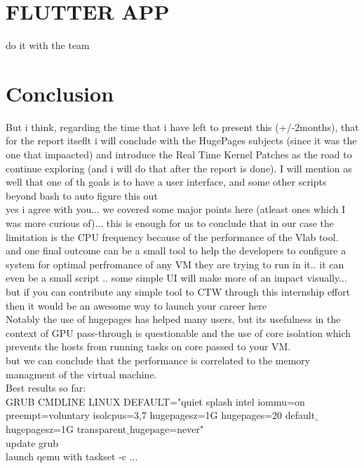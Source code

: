 \documentclass[11pt, a4paper, oneside]{article}
\theoremstyle{definition}
\begin{document}
\vfill
\pagebreak
\section{FLUTTER APP}

do it with the team\\

\vfill
\pagebreak
\section{Conclusion}
But i think, regarding the time that i have left to present this (+/-2months), that for the report itseflt i will conclude with the HugePages subjects (since it was the one that impaacted) and introduce the Real Time Kernel Patches as the road to continue exploring (and i will do that after the report is done). I will mention as well that one of th goals is to have a user interface, and some other scripts beyond bash to auto figure this out\\
yes i agree with you... we covered some major points here (atleast ones which I was more curious of)... this is enough for us to conclude that in our case the limitation is the CPU frequency because of the performance of the Vlab tool.\\
and one final outcome can be a small tool to help the developers to configure a system for optimal perfromance of any VM they are trying to run in it.. it can even be a small script .. some simple UI will make more of an impact visually... but if you can contribute any simple tool to CTW through this internship effort then it would be an awesome way to launch your career here \\

Notably the use of hugepages has helped many users, but its usefulness
in the context of GPU pass-through is questionable and the use of core
isolation which prevents the hosts from running tasks on core passed to
your VM.\\

but we can conclude that the performance is correlated to the memory managment of the virtual machine. \\


Best results so far:\\
GRUB CMDLINE LINUX DEFAULT="quiet splash intel iommu=on preempt=voluntary isolcpus=3,7 hugepagesz=1G hugepages=20 default$\_$hugepagesz=1G transparent$\_$hugepage=never"\\
update grub\\
launch qemu with taskset -c ...
\end{document}
